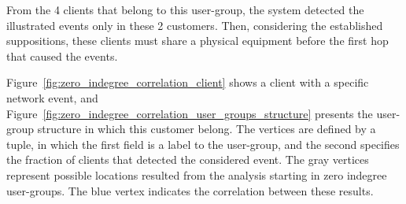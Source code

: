 From the 4 clients that belong to this user-group, the system
detected the illustrated events only in these 2 customers.
Then, considering the established suppositions,
these clients must share a physical equipment before the
first hop that caused the events.

Figure~\ref{fig:zero_indegree_correlation_client} shows a client with a
specific network event, and
Figure~\ref{fig:zero_indegree_correlation_user_groups_structure} presents the
user-group structure in which this customer belong.
The vertices are defined by a tuple, in which the first field is a
label to the user-group, and the second specifies the fraction of clients
that detected the considered event.
The gray vertices represent
possible locations resulted from the analysis starting in zero indegree
user-groups.
The blue vertex indicates the correlation between these results.

